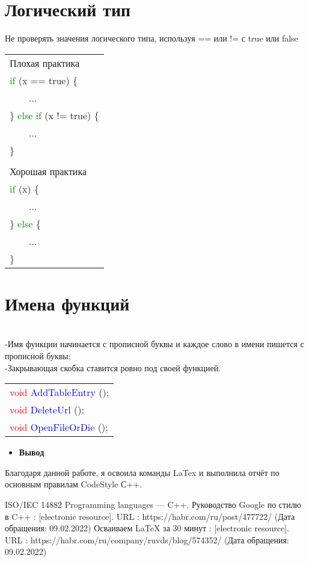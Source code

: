 \documentclass[12pt, letterpaper]{article}
\begin{document}
\section{Логический тип}
Не проверять значения логического типа, используя == или != с true или false\\
\begin{flushleft}
\begin{tabular}{ |l| } 
\hline
Плохая практика\\
\textcolor{green}{if }(x == true) \{\\
\ \ \ \ ...\\
\} \textcolor{green}{else if }(x != true) \{\\
\ \ \ \ ...\\
\}\\
\\
Хорошая практика\\
\textcolor{green}{if }(x) \{\\
\ \ \ \ ...\\
\} \textcolor{green}{else }\{\\
\ \ \ \ ...\\
\}\\
\hline
\end{tabular}
\end{flushleft}

\section{Имена функций}
\\-Имя функции начинается с прописной буквы и каждое слово в имени пишется с прописной буквы;
\\-Закрывающая скобка ставится ровно под своей функцией.
\begin{flushleft}
\begin{tabular}{ |l| } 
\hline
\textcolor{red}{void} \textcolor{blue}{AddTableEntry} ();\\
\textcolor{red}{void} \textcolor{blue}{DeleteUrl} ();\\
\textcolor{red}{void} \textcolor{blue}{OpenFileOrDie} ();\\
\hline
\end{tabular}
\end{flushleft}
\begin{itemize}
\newpage
\item\Large\textbf{Вывод}
\end{itemize}
Благодаря данной работе, я освоила команды LaTex и выполнила отчёт по основным правилам CodeStyle С++. 
\begin{thebibliography}{3}
ISO/IEC 14882 Programming languages — C++.
Руководство Google по стилю в C++ : [electronic resource].
URL : https://habr.com/ru/post/477722/ (Дата обращения: 09.02.2022)
Осваиваем LaTeX за 30 минут : [electronic resource].
URL : https://habr.com/ru/company/ruvds/blog/574352/ (Дата обращения: 09.02.2022)
\end{thebibliography}
\end{document}

